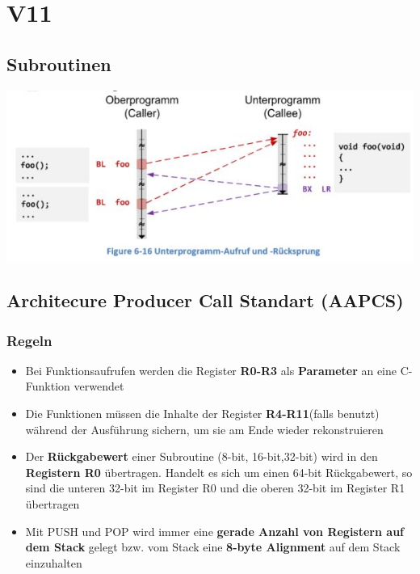 \section{V11}
\subsection{Subroutinen}
\includegraphics[width=0.8\linewidth]{images/subroutinen} 

\subsection{Architecure Producer Call Standart (AAPCS)}
\subsubsection{Regeln}
\begin{itemize}
    \item Bei Funktionsaufrufen werden die Register \textbf{R0-R3} als \textbf{Parameter} an eine C-Funktion verwendet
    \item Die Funktionen müssen die Inhalte der Register \textbf{R4-R11}(falls benutzt) während der Ausführung sichern, um sie am Ende wieder rekonstruieren
    \item Der \textbf{Rückgabewert} einer Subroutine (8-bit, 16-bit,32-bit) wird in den \textbf{Registern R0} übertragen. Handelt es sich um einen 64-bit Rückgabewert, so sind die unteren 32-bit im Register R0 und die oberen 32-bit im Register R1 übertragen
    \item Mit PUSH und POP wird immer eine \textbf{gerade Anzahl von Registern auf dem Stack} gelegt bzw. vom Stack eine \textbf{8-byte Alignment} auf dem Stack einzuhalten
\end{itemize}